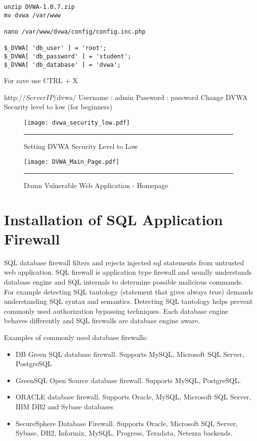 \begin{verbatim}
unzip DVWA-1.0.7.zip
mv dvwa /var/www

nano /var/www/dvwa/config/config.inc.php

$_DVWA[ 'db_user' ] = 'root';
$_DVWA[ 'db_password' ] = 'student';
$_DVWA[ 'db_database' ] = 'dvwa';
\end{verbatim}
For save use  CTRL + X


http://$ServerIP$/dvwa/
Username : admin
Password : password
Change DVWA Security level to low (for beginners)

\begin{figure}[H] 
 \centering 
 \texttt{[image: dvwa\_security\_low.pdf]}
 \rule{25em}{0.5pt}  
 \caption{Setting DVWA Security Level to Low} 
 \label{Setting DVWA Security Level to Low} 
\end{figure}


\begin{figure}[H] 
 \centering 
 \texttt{[image: DVWA\_Main\_Page.pdf]}
 \rule{30em}{0.5pt}  
 \caption{Damn Vulnerable Web Application - Homepage} 
 \label{Damn Vulnerable Web Application - Homepage} 
\end{figure}


\section{Installation of SQL Application Firewall}
SQL database firewall filters and rejects injected sql statements from untrusted web application. SQL firewall is application type firewall and usually understands database engine and SQL internals to determine possible malicious commands. For example detecting  SQL tautology (statement that gives always true) demands understanding SQL syntax and semantics. Detecting SQL tautology helps prevent commonly used authorization bypassing techniques.
Each database engine behaves differently and SQL firewalls are database engine aware.


Examples of commonly used database firewalls:
\begin{itemize}
\item DB Green SQL database firewall. Supports MySQL, Microsoft SQL Server, PostgreSQL
\item GreenSQL Open Source database firewall. Supports MySQL, PostgreSQL.
\item ORACLE database firewall. Supports Oracle, MySQL, Microsoft SQL Server, IBM DB2 and Sybase databases
\item SecureSphere Database Firewall. Supports Oracle, Microsoft SQL Server, Sybase, DB2, Informix, MySQL, Progress, Teradata, Netezza backends.
\end{itemize}

